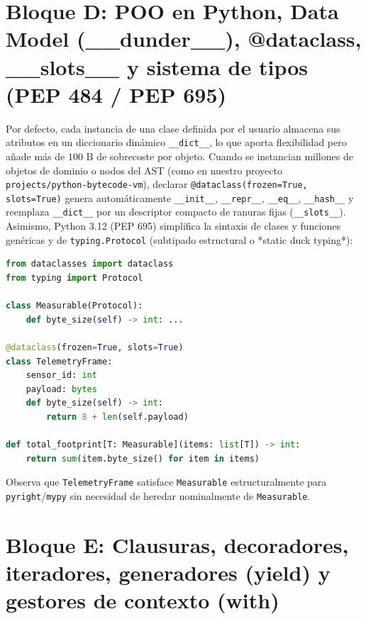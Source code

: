 \documentclass{book}
\begin{document}
\section{Bloque D: POO en Python, Data Model (\_\_dunder\_\_), @dataclass, \_\_slots\_\_ y sistema de tipos (PEP 484 / PEP 695)}

Por defecto, cada instancia de una clase definida por el usuario almacena sus atributos en un diccionario dinámico \texttt{\_\_dict\_\_}, lo que aporta flexibilidad pero añade más de \(100\text{ B}\) de sobrecoste por objeto. Cuando se instancian millones de objetos de dominio o nodos del AST (como en nuestro proyecto \texttt{projects/python-bytecode-vm}), declarar \texttt{@dataclass(frozen=True, slots=True)} genera automáticamente \texttt{\_\_init\_\_}, \texttt{\_\_repr\_\_}, \texttt{\_\_eq\_\_}, \texttt{\_\_hash\_\_} y reemplaza \texttt{\_\_dict\_\_} por un descriptor compacto de ranuras fijas (\texttt{\_\_slots\_\_}). Asimismo, Python 3.12 (PEP 695) simplifica la sintaxis de clases y funciones genéricas y de \texttt{typing.Protocol} (subtipado estructural o *static duck typing*):
\begin{lstlisting}[style=studium,language={Python}]
from dataclasses import dataclass
from typing import Protocol

class Measurable(Protocol):
    def byte_size(self) -> int: ...

@dataclass(frozen=True, slots=True)
class TelemetryFrame:
    sensor_id: int
    payload: bytes
    def byte_size(self) -> int:
        return 8 + len(self.payload)

def total_footprint[T: Measurable](items: list[T]) -> int:
    return sum(item.byte_size() for item in items)
\end{lstlisting}
Observa que \texttt{TelemetryFrame} satisface \texttt{Measurable} estructuralmente para \texttt{pyright}/\texttt{mypy} sin necesidad de heredar nominalmente de \texttt{Measurable}.

\section{Bloque E: Clausuras, decoradores, iteradores, generadores (yield) y gestores de contexto (with)}
\end{document}
